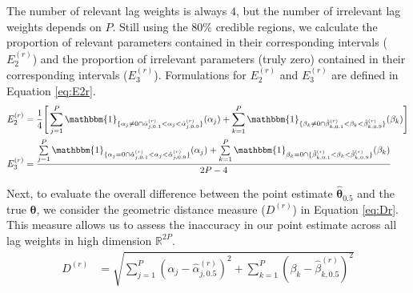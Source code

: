 The number of relevant lag weights is always $4$, but the number of irrelevant lag weights depends on $P$. Still using the $80\%$ credible regions, we calculate the proportion of relevant parameters contained in their corresponding intervals ($E_2^{(r)}$) and the proportion of irrelevant parameters (truly zero) contained in their corresponding intervals ($E_3^{(r)}$). Formulations for $E_2^{(r)}$ and $E_3^{(r)}$ are defined in Equation \ref{eq:E2r}. 
\begin{equation}
\label{eq:E2r}
	\begin{split}
	E^{(r)}_2&=\frac{1}{4}\Bigg[\sum\limits_{j=1}^P \mathbbm{1}_{\{\alpha_j\neq 0 \cap \hat{\alpha}^{(r)}_{j,0.1}<\alpha_j<\hat{\alpha}^{(r)}_{j,0.9}  \}} (\alpha_j) + \sum\limits_{k=1}^P \mathbbm{1}_{\{ \beta_k\neq 0 \cap \hat{\beta}^{(r)}_{k,0.1}<\beta_k<\hat{\beta}^{(r)}_{k,0.9}  \}} (\beta_k)\Bigg]\\
	E^{(r)}_3&=\frac{\sum\limits_{j=1}^P \mathbbm{1}_{\{\alpha_j= 0 \cap \hat{\alpha}^{(r)}_{j,0.1}<\alpha_j<\hat{\alpha}^{(r)}_{j,0.9}  \}} (\alpha_j) + \sum\limits_{k=1}^P \mathbbm{1}_{\beta_k= 0 \cap\{ \hat{\beta}^{(r)}_{k,0.1}<\beta_k<\hat{\beta}^{(r)}_{k,0.9}  \}} (\beta_k)}{2P-4}\\
	\end{split}
\end{equation}

Next, to evaluate the overall difference between the point estimate $\hat{\bm{\theta}}_{0.5}$ and the true $\bm{\theta}$, we consider the geometric distance measure ($D^{(r)}$) in Equation \ref{eq:Dr}. This measure allows us to assess the inaccuracy in our point estimate across all lag weights in high dimension $\mathbb{R}^{2P}$. 
\begin{equation}
\label{eq:Dr}
	\begin{split}
	D^{(r)}&=\sqrt{\sum\limits_{j=1}^P (\alpha_j-\hat{\alpha}^{(r)}_{j,0.5})^2+\sum\limits_{k=1}^P (\beta_k-\hat{\beta}^{(r)}_{k,0.5})^2}\\
	\end{split}
\end{equation}

